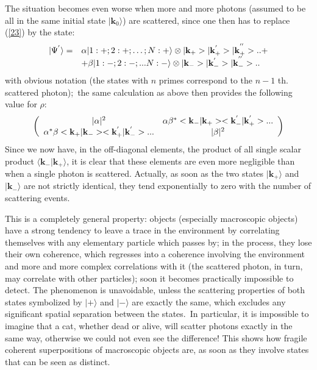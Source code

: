 \documentclass[12pt,onecolumn]{article}%
\begin{document}
The situation becomes even worse when more and more photons (assumed to be all
in the same initial state $|\mathbf{k}_{0}\rangle$) are scattered, since one then
has to replace (\ref{23}) by the state:%
\begin{equation}%
\begin{array}
[c]{cl}%
|\Psi^{^{\prime}}\rangle = & \alpha|1:+;2:+;\ldots ;N:+\rangle \otimes|\mathbf{k}%
_{+}>|\mathbf{k}_{+}^{^{\prime}}>|\mathbf{k}_{+}^{^{^{\prime\prime}}%
}>..+\\
& +\beta|1:-;2:-;...N:-\rangle \otimes|\mathbf{k}_{-}>|\mathbf{k}%
_{-}^{^{\prime}}>|\mathbf{k}_{-}^{^{^{\prime\prime}}}>..
\end{array}
\label{25}%
\end{equation}
with obvious notation (the states with $n$ primes correspond to the $n-1$ th.
scattered photon);\ the same calculation as above then provides the following
value for $\rho$:%
\begin{equation}
\left(
\begin{array}
[c]{cc}%
|\alpha|^{2} & \alpha\beta^{\ast}<\mathbf{k}_{-}|\mathbf{k}%
_{+}><\mathbf{k}_{-}^{^{\prime}}|\mathbf{k}_{+}^{^{\prime}}>...\\
\alpha^{\ast}\beta<\mathbf{k}_{+}|\mathbf{k}_{-}><\mathbf{k}_{+}^{^{\prime
}}|\mathbf{k}_{-}^{^{\prime}}>... & |\beta|^{2}%
\end{array}
\right)  \label{26}%
\end{equation}
Since we now have, in the off-diagonal elements, the product of all single
scalar product $\langle \mathbf{k}_{-}|\mathbf{k}_{+}\rangle$, it is clear that these
elements are even more negligible than when a single photon is scattered.
Actually, as soon as the two states $|\mathbf{k}_{+}\rangle$ and $|
\mathbf{k}_{-}\rangle$ are not strictly identical, they tend exponentially to zero
with the number of scattering events.

This is a completely general property: objects (especially macroscopic
objects) have a strong tendency to leave a trace in the environment by
correlating themselves with any elementary particle which passes by; in the
process, they lose their own coherence, which regresses into a coherence
involving the environment and more and more complex correlations with it (the
scattered photon, in turn, may correlate with other particles); soon it
becomes practically impossible to detect. The phenomenon is unavoidable,
unless the scattering properties of both states symbolized by $|+\rangle $ and
$|-\rangle $ are exactly the same, which excludes any significant spatial
separation between the states.\ In particular, it is impossible to imagine
that a cat, whether dead or alive, will scatter photons exactly in the same
way, otherwise we could not even see the difference! This shows how fragile
coherent superpositions of macroscopic objects are, as soon as they involve
states that can be seen as distinct.
\end{document}

